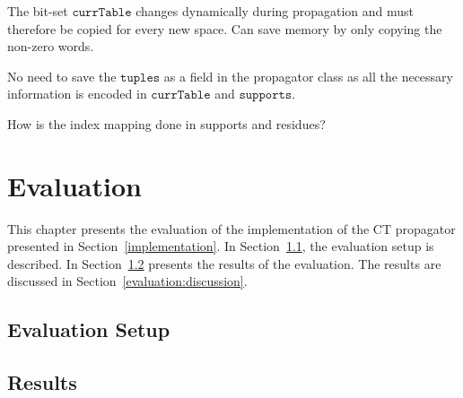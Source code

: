 \documentclass[a4paper,11pt]{article}
\newcommand{\T}[1]{\texttt{#1}}
\newcommand{\Todo}[1]{{\color{blue}#1}}
\newcommand{\Secref}[1]{Section~\ref{#1}}
\newcommand{\Chapref}[1]{Section~\ref{#1}}
\newcommand{\CurrTable}{\texttt{currTable}}
\newcommand{\Supports}{\texttt{supports}}
\numberwithin{equation}{section}
\begin{document}
The bit-set $\CurrTable$ changes dynamically during propagation and must therefore be copied for
every new space. Can save memory by only copying the non-zero words.

No need to save the $\T{tuples}$ as a field in the propagator class as all
the necessary information is encoded in $\CurrTable$ and $\Supports$.

\Todo{How is the index mapping done in supports and residues?}









\section{Evaluation}
\label{evaluation}
This chapter presents the evaluation of the implementation of the CT propagator
presented in \Chapref{implementation}. In \Secref{evaluation:setup},
the evaluation setup is described. In \Secref{evaluation:results} presents
the results of the evaluation. The results are discussed in \Secref{evaluation:discussion}.


\subsection{Evaluation Setup}
\label{evaluation:setup}
\subsection{Results}
\label{evaluation:results}
\end{document}
